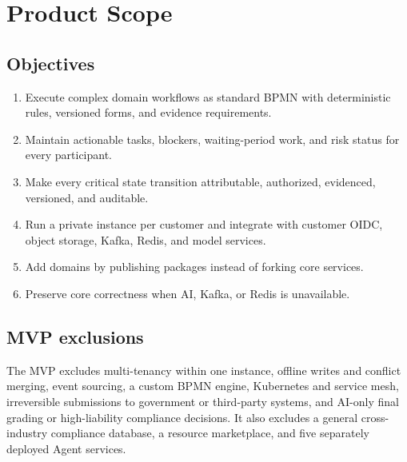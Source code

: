 \documentclass[journal,a4paper,onecolumn]{IEEEtran}
\begin{document}
\section{Product Scope}
\subsection{Objectives}
\begin{enumerate}[leftmargin=*]
\item Execute complex domain workflows as standard BPMN with deterministic rules, versioned forms, and evidence requirements.
\item Maintain actionable tasks, blockers, waiting-period work, and risk status for every participant.
\item Make every critical state transition attributable, authorized, evidenced, versioned, and auditable.
\item Run a private instance per customer and integrate with customer OIDC, object storage, Kafka, Redis, and model services.
\item Add domains by publishing packages instead of forking core services.
\item Preserve core correctness when AI, Kafka, or Redis is unavailable.
\end{enumerate}

\subsection{MVP exclusions}
The MVP excludes multi-tenancy within one instance, offline writes and conflict merging, event sourcing, a custom BPMN engine, Kubernetes and service mesh, irreversible submissions to government or third-party systems, and AI-only final grading or high-liability compliance decisions. It also excludes a general cross-industry compliance database, a resource marketplace, and five separately deployed Agent services.
\end{document}
